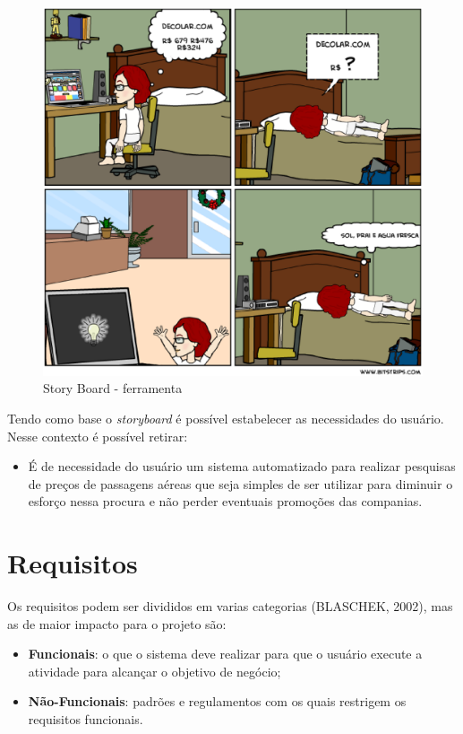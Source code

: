 \begin{figure}[H]
	\centering
	\label{fig02}
		\includegraphics[keepaspectratio=true,scale=0.5]{figuras/ferramenta.eps}
		\caption{Story Board - ferramenta}
\end{figure}

Tendo como base o \textit{storyboard} é possível estabelecer as necessidades do usuário. Nesse contexto é possível retirar:

\begin{itemize}
	\item É de necessidade do usuário um sistema automatizado para realizar pesquisas de preços de passagens aéreas que seja simples de ser utilizar para diminuir o esforço nessa procura e não perder eventuais promoções das companias.
\end{itemize}

\section{Requisitos}

Os requisitos podem ser divididos em varias categorias (BLASCHEK, 2002), mas as de maior impacto para o projeto são:
\begin{itemize}
	\item \textbf{Funcionais}: o que o sistema deve realizar para que o usuário execute a atividade para alcançar o objetivo de negócio;
	\item \textbf{Não-Funcionais}: padrões e regulamentos com os quais restrigem os requisitos funcionais.
\end{itemize}

